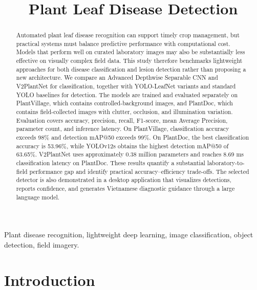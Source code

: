 \documentclass[10pt, conference]{IEEEtran}
\begin{document}
\title{Plant Leaf Disease Detection}

\author{
}

\maketitle

\begin{abstract}
Automated plant leaf disease recognition can support timely crop management, but practical systems must balance predictive performance with computational cost. Models that perform well on curated laboratory images may also be substantially less effective on visually complex field data. This study therefore benchmarks lightweight approaches for both disease classification and lesion detection rather than proposing a new architecture. We compare an Advanced Depthwise Separable CNN and V2PlantNet for classification, together with YOLO-LeafNet variants and standard YOLO baselines for detection. The models are trained and evaluated separately on PlantVillage, which contains controlled-background images, and PlantDoc, which contains field-collected images with clutter, occlusion, and illumination variation. Evaluation covers accuracy, precision, recall, F1-score, mean Average Precision, parameter count, and inference latency. On PlantVillage, classification accuracy exceeds 98\% and detection mAP@50 exceeds 99\%. On PlantDoc, the best classification accuracy is 53.96\%, while YOLOv12s obtains the highest detection mAP@50 of 63.65\%. V2PlantNet uses approximately 0.38 million parameters and reaches 8.69 ms classification latency on PlantDoc. These results quantify a substantial laboratory-to-field performance gap and identify practical accuracy--efficiency trade-offs. The selected detector is also demonstrated in a desktop application that visualizes detections, reports confidence, and generates Vietnamese diagnostic guidance through a large language model.
\end{abstract}

\begin{IEEEkeywords}
    Plant disease recognition, lightweight deep learning, image classification, object detection, field imagery.
\end{IEEEkeywords}

\section{Introduction}
\label{sec:intro}
\end{document}
